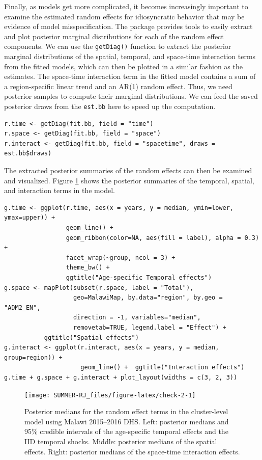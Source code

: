 Finally, as models get more complicated, it becomes increasingly important to examine the estimated random effects for idiosyncratic behavior that may be evidence of model misspecification. The  package provides tools to easily extract and plot posterior marginal distributions for each of the random effect components. We can use the \texttt{getDiag()} function to extract the posterior marginal distributions of the spatial, temporal, and space-time interaction terms from the fitted models, which can then be plotted in a similar fashion as the estimates. The space-time interaction term in the fitted model contains a sum of a region-specific linear trend and an AR(1) random effect. Thus, we need posterior samples to compute their marginal distributions. We can feed the saved posterior draws from the \texttt{est.bb} here to speed up the computation.

\begin{verbatim}
r.time <- getDiag(fit.bb, field = "time")
r.space <- getDiag(fit.bb, field = "space")
r.interact <- getDiag(fit.bb, field = "spacetime", draws = est.bb$draws)
\end{verbatim}

The extracted posterior summaries of the random effects can then be examined and visualized. Figure \ref{fig:check-2} shows the posterior summaries of the temporal, spatial, and interaction terms in the model.

\begin{verbatim}
g.time <- ggplot(r.time, aes(x = years, y = median, ymin=lower, ymax=upper)) + 
                 geom_line() + 
                 geom_ribbon(color=NA, aes(fill = label), alpha = 0.3) +
                 facet_wrap(~group, ncol = 3) + 
                 theme_bw() + 
                 ggtitle("Age-specific Temporal effects")
g.space <- mapPlot(subset(r.space, label = "Total"), 
                   geo=MalawiMap, by.data="region", by.geo = "ADM2_EN", 
                   direction = -1, variables="median", 
                   removetab=TRUE, legend.label = "Effect") + 
           ggtitle("Spatial effects") 
g.interact <- ggplot(r.interact, aes(x = years, y = median, group=region)) + 
                     geom_line() +  ggtitle("Interaction effects") 
g.time + g.space + g.interact + plot_layout(widths = c(3, 2, 3)) 
\end{verbatim}

\begin{figure}[!ht]
\texttt{[image: SUMMER-RJ\_files/figure-latex/check-2-1]} \caption{Posterior medians for the random effect terms in the cluster-level model using Malawi 2015--2016 DHS. Left: posterior medians and 95\% credible intervals of the age-specific temporal effects and the IID temporal shocks. Middle: posterior medians of the spatial effects. Right: posterior medians of the space-time interaction effects.}\label{fig:check-2}
\end{figure}

